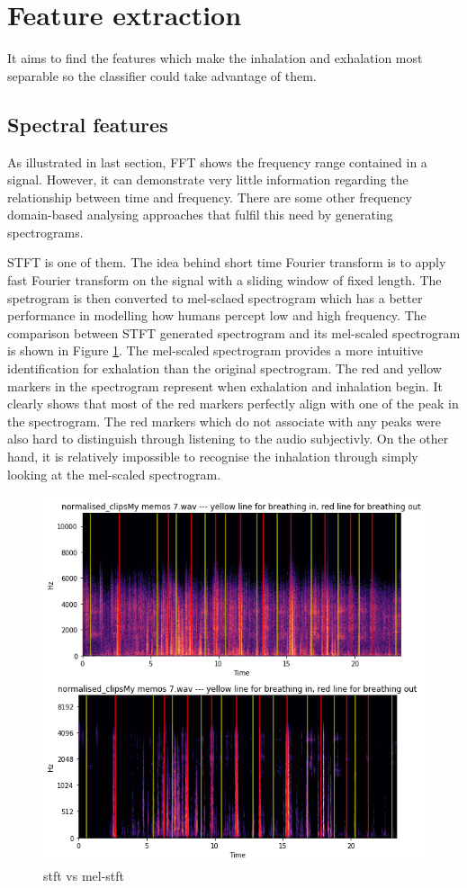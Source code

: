 \section{Feature extraction}
It aims to find the features which make the inhalation and exhalation most separable so the classifier could take advantage of them. 

\subsection{Spectral features}
As illustrated in last section, FFT shows the frequency range contained in a signal. However, it can demonstrate very little information regarding the relationship between time and frequency. There are some other frequency domain-based analysing approaches that fulfil this need by generating spectrograms. 

STFT is one of them. The idea behind short time Fourier transform is to apply fast Fourier transform on the signal with a sliding window of fixed length. The spetrogram is then converted to mel-sclaed spectrogram which has a better performance in modelling how humans percept low and high frequency. The comparison between STFT generated spectrogram and its mel-scaled spectrogram is shown in Figure \ref{fig:stft_mel-stft}. The mel-scaled spectrogram provides a more intuitive identification for exhalation than the original spectrogram. The red and yellow markers in the spectrogram represent when exhalation and inhalation begin. It clearly shows that most of the red markers perfectly align with one of the peak in the spectrogram. The red markers which do not associate with any peaks were also hard to distinguish through listening to the audio subjectivly. On the other hand, it is relatively impossible to recognise the inhalation through simply looking at the mel-scaled spectrogram.

\begin{figure}[h]
    \centerline{\includegraphics[scale=0.6]{figures/stft_mel-stft.png}}
    \caption{stft vs mel-stft}
    \label{fig:stft_mel-stft}
\end{figure}

